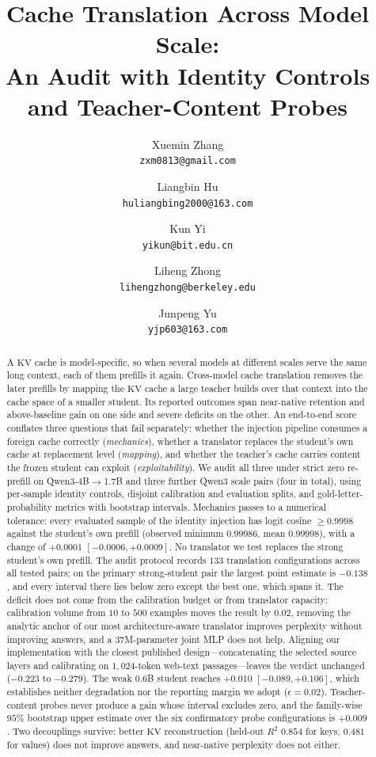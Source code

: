 \documentclass[10pt]{article}
\title{Cache Translation Across Model Scale:\\
An Audit with Identity Controls and Teacher-Content Probes}
\author[1]{Xuemin Zhang\\\texttt{\small zxm0813@gmail.com}}
\author[1]{Liangbin Hu\\\texttt{\small huliangbing2000@163.com}}
\author[1]{Kun Yi\\\texttt{\small yikun@bit.edu.cn}}
\author[1]{Liheng Zhong\\\texttt{\small lihengzhong@berkeley.edu}}
\author[1]{Junpeng Yu\\\texttt{\small yjp603@163.com}}
\affil[1]{CETC}
\date{}
\newcommand{\kv}{\ensuremath{\mathrm{KV}}}
\begin{document}
\maketitle

\begin{abstract}
A \kv{} cache is model-specific, so when several models at different scales
serve the same long context, each of them prefills it again. Cross-model cache
translation removes the later prefills by mapping the \kv{} cache a large
teacher builds over that context into the cache space of a smaller student.
Its reported outcomes span near-native retention and above-baseline gain on one
side and severe deficits on the other. An end-to-end score conflates three
questions that fail separately: whether the injection pipeline consumes a
foreign cache
correctly (\emph{mechanics}), whether a translator replaces the student's own cache
at replacement level (\emph{mapping}), and whether the teacher's cache carries
content the frozen student can exploit (\emph{exploitability}). We audit all
three under strict zero re-prefill on Qwen3-4B$\to$1.7B and three further Qwen3
scale pairs (four in total), using per-sample identity controls, disjoint
calibration and evaluation splits, and gold-letter-probability metrics with
bootstrap intervals. Mechanics passes to a numerical tolerance: every evaluated
sample of the identity injection has logit cosine $\ge 0.9998$ against the
student's own prefill (observed minimum $0.99986$, mean $0.99998$), with a change
of $+0.0001$ $[-0.0006,+0.0009]$.
No translator we test replaces the strong student's own prefill. The audit
protocol records $133$ translation configurations across all tested pairs; on
the primary strong-student pair the largest point estimate is $-0.138$, and
every interval there lies below zero except the best one, which spans it. The deficit does not come
from the calibration budget or from translator capacity:
calibration volume from $10$ to $500$ examples moves the result by $0.02$,
removing the analytic anchor of our most architecture-aware translator improves
perplexity without improving answers, and a $37$M-parameter joint MLP does not
help. Aligning our implementation with the closest published design---concatenating
the selected source layers and calibrating on $1{,}024$-token web-text
passages---leaves the verdict unchanged ($-0.223$ to $-0.279$). The weak $0.6$B
student reaches $+0.010$ $[-0.089,+0.106]$, which establishes neither
degradation nor the reporting margin we adopt ($\epsilon{=}0.02$).
Teacher-content probes never produce a gain whose interval excludes zero, and the
family-wise $95\%$ bootstrap upper estimate over the six confirmatory probe
configurations is $+0.009$. Two decouplings survive: better \kv{}
reconstruction (held-out $R^2$ $0.854$ for keys, $0.481$ for values) does not
improve answers, and near-native perplexity does not either.
\end{abstract}
\end{document}
